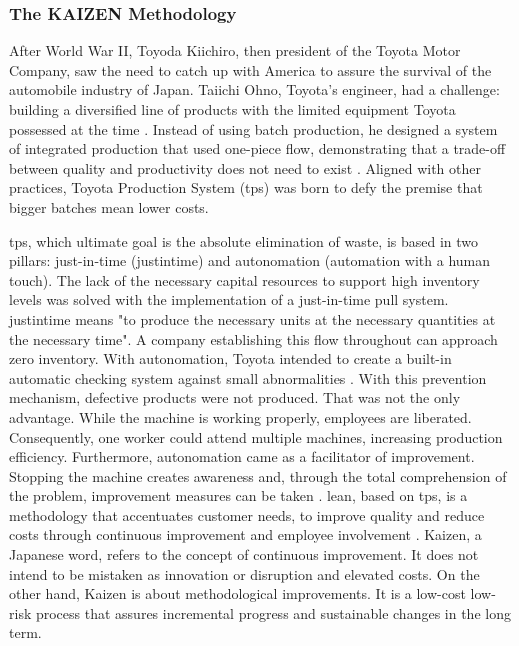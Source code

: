 \documentclass[]{article}
\begin{document}
\subsubsection{The KAIZEN Methodology}\label{methodology}
After World War II, Toyoda Kiichiro, then president of the Toyota Motor Company, saw the need
to catch up with America to assure the survival of the automobile industry of Japan. Taiichi Ohno,
Toyota’s engineer, had a challenge: building a diversified line of products with the limited
equipment Toyota possessed at the time \cite{ohno_toyota_1988}. Instead of using batch production, he designed a system of integrated production that used one-piece flow, demonstrating that a trade-off between quality and productivity does not need to exist \cite{netland_routledge_2016}. Aligned with other practices, Toyota Production System (\gls{tps}) was born to defy the premise that bigger batches mean lower costs.

\gls{tps}, which ultimate goal is the absolute elimination of waste, is based in two pillars: just-in-time (\gls{justintime}) and autonomation (automation with a human touch)\cite{ohno_toyota_1988}. The lack of the necessary capital resources to support high inventory levels was solved with the implementation of a just-in-time pull system. \gls{justintime} means "to produce the necessary units at the necessary quantities at the necessary time". A company establishing this flow throughout can approach zero inventory. With autonomation, Toyota intended to create a built-in automatic checking system against small abnormalities \cite{liker_toyota_2006}.
With this prevention mechanism, defective products were not produced. That was not the only
advantage. While the machine is working properly, employees are liberated. Consequently, one
worker could attend multiple machines, increasing production efficiency. Furthermore, autonomation came as a facilitator of improvement. Stopping the machine creates awareness and, through
the total comprehension of the problem, improvement measures can be taken \cite{ohno_toyota_1988}.
\gls{lean}, based on \gls{tps}, is a methodology that accentuates customer needs, to improve quality
and reduce costs through continuous improvement and employee involvement \cite{graban_lean_2011}.
Kaizen, a Japanese word, refers to the concept of continuous improvement. It does not intend
to be mistaken as innovation or disruption and elevated costs. On the other hand, Kaizen is about
methodological improvements. It is a low-cost low-risk process that assures incremental progress
and sustainable changes in the long term.
\end{document}
